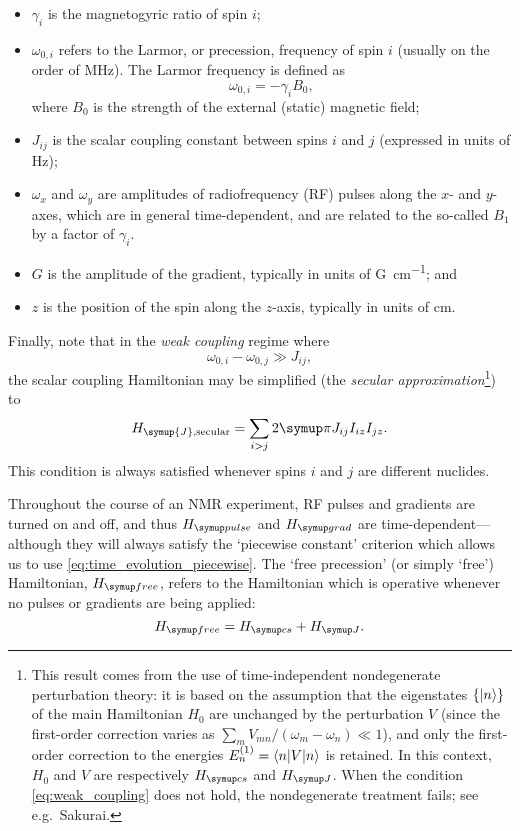 \begin{itemize}
    \item $\gamma_i$ is the magnetogyric ratio of spin $i$;
    \item $\omega_{0,i}$ refers to the Larmor, or precession, frequency of spin $i$ (usually on the order of \unit{MHz}). The Larmor frequency is defined as
        \begin{equation}
            \label{eq:larmor_frequency}
            \omega_{0,i} = -\gamma_i B_0,
        \end{equation}
        where $B_0$ is the strength of the external (static) magnetic field;
    \item $J_{ij}$ is the scalar coupling constant between spins $i$ and $j$ (expressed in units of \unit{Hz});
    \item $\omega_x$ and $\omega_y$ are amplitudes of radiofrequency (RF) pulses along the $x$- and $y$-axes, which are in general time-dependent, and are related to the so-called $B_1$ by a factor of $\gamma_i$.
    \item $G$ is the amplitude of the gradient, typically in units of \unit{G\per\cm}; and
    \item $z$ is the position of the spin along the $z$-axis, typically in units of \unit{\cm}.
\end{itemize}

Finally, note that in the \textit{weak coupling} regime where
\begin{equation}
    \omega_{0,i} - \omega_{0,j} \gg J_{ij}, \label{eq:weak_coupling}
\end{equation}
the scalar coupling Hamiltonian may be simplified (the \textit{secular approximation}\footnote{This result comes from the use of time-independent nondegenerate perturbation theory: it is based on the assumption that the eigenstates $\{\ket{n}\}$ of the main Hamiltonian $H_0$ are unchanged by the perturbation $V$ (since the first-order correction varies as $\sum_m V_{mn}/(\omega_m - \omega_n) \ll 1$), and only the first-order correction to the energies $E_n^{(1)} = \braket{n | V | n}$ is retained. In this context, $H_0$ and $V$ are respectively $\Hcs$ and $\HJ$. When the condition \cref{eq:weak_coupling} does not hold, the nondegenerate treatment fails; see e.g.\ Sakurai\autocite{Sakurai2021}.}) to
\begin{equation}
    H_{\symup{J}\text{,secular}} = \sum_{i > j} 2\cpi J_{ij} I_{iz}I_{jz} \label{eq:h_j_secular}.
\end{equation}
This condition is always satisfied whenever spins $i$ and $j$ are different nuclides.

Throughout the course of an NMR experiment, RF pulses and gradients are turned on and off, and thus $\Hpulse$ and $\Hgrad$ are time-dependent---although they will always satisfy the `piecewise constant' criterion which allows us to use \cref{eq:time_evolution_piecewise}.
The `free precession' (or simply `free') Hamiltonian, $\Hfree$, refers to the Hamiltonian which is operative whenever no pulses or gradients are being applied: 
\begin{equation}
    \label{eq:h_free}
    \Hfree = \Hcs + \HJ.
\end{equation}
